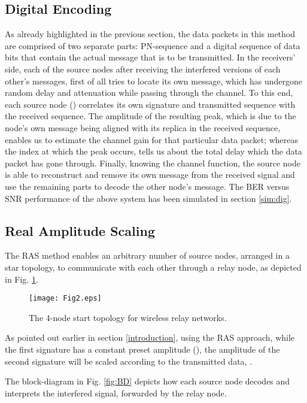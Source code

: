 \documentclass[conference]{IEEEtran}
\begin{document}
\subsection{Digital Encoding}\label{sec:digitEnc}

As already highlighted in the previous section, the data packets in this method are comprised of two separate parts: PN-sequence and a digital sequence of data bits that contain the actual message that is to be transmitted. In the receivers' side, each of the source nodes after receiving the interfered versions of each other's messages, first of all tries to locate its own message, which has undergone random delay and attenuation while passing through the channel. To this end, each source node () correlates its own signature and transmitted sequence with the received sequence. The amplitude of the resulting peak, which is due to the node's own message being aligned with its replica in the received sequence, enables us to estimate the channel gain for that particular data packet; whereas the index at which the peak occurs, tells us about the total delay which the data packet has gone through. Finally, knowing the channel function, the source node is able to reconstruct and remove its own message from the received signal and use the remaining parts to decode the other node's message. The BER versus SNR performance of the above system has been simulated in section \ref{sim:dig}.

\subsection{Real Amplitude Scaling}\label{sec:RealNum}
The RAS method enables an arbitrary number of source nodes, arranged in a star topology, to communicate with each other through a relay node, as depicted in Fig. \ref{fig:starnet}. 

\begin{figure}[tp]
\centering
\texttt{[image: Fig2.eps]}
\caption{The 4-node start topology for wireless relay networks.}
\label{fig:starnet}
\end{figure}

As pointed out earlier in section \ref{introduction}, using the RAS approach, while the first signature has a constant preset amplitude (), the amplitude of the second signature will be scaled according to the transmitted data, .

The block-diagram in Fig. \ref{fig:BD} depicts how each source node decodes and interprets the interfered signal, forwarded by the relay node.
\end{document}
